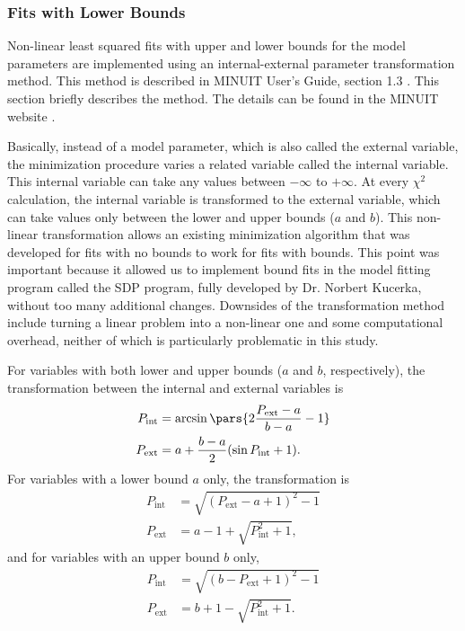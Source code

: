 \subsubsection{Fits with Lower Bounds}
Non-linear least squared fits with upper and lower bounds for the model
parameters are implemented using an internal-external parameter transformation
method. This method is described in MINUIT User's Guide, section 1.3 
\cite{minuit2}. This section briefly describes the method. The details
can be found in the MINUIT website \cite{minuit}.

Basically, instead of a model parameter, which is also called the external variable, 
the minimization procedure varies a related variable called the internal variable.
This internal variable can take any values between $-\infty$ to $+\infty$. 
At every $\chi^2$ calculation, the internal variable is transformed to 
the external variable, which can take values only between the lower and 
upper bounds ($a$ and $b$). This non-linear transformation allows an existing minimization
algorithm that was developed for fits with no bounds to work for fits with bounds.
This point was important because it allowed us to implement bound fits in
the model fitting program called the SDP program, 
fully developed by Dr. Norbert Kucerka, without too many additional changes.
Downsides of the transformation method include turning a linear problem into
a non-linear one and some computational overhead, neither of which is particularly
problematic in this study. 

For variables with both lower and upper bounds 
($a$ and $b$, respectively), the transformation between the internal and
external variables is
\begin{align}
  P_\textrm{int} &= \arcsin \pars{2\frac{P_\textrm{ext}-a}{b-a}-1}  \\
  P_\textrm{ext} &= a + \frac{b-a}{2}(\sin P_\textrm{int}+1).
\end{align}
For variables with a lower bound $a$ only, the transformation is
\begin{align}
  P_\textrm{int} &= \sqrt{(P_\textrm{ext}-a+1)^2 - 1} \\
  P_\textrm{ext} &= a - 1 + \sqrt{P_\textrm{int}^2+1}, 
\end{align}
and for variables with an upper bound $b$ only,
\begin{align}
  P_\textrm{int} &= \sqrt{(b-P_\textrm{ext}+1)^2 - 1} \\
  P_\textrm{ext} &= b + 1 - \sqrt{P_\textrm{int}^2+1}.
\end{align}

